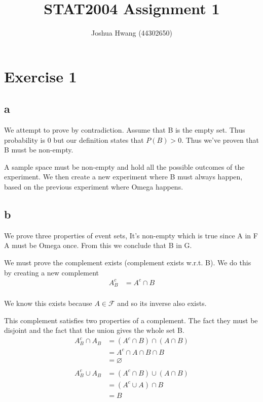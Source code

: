 \documentclass{article}
\title{STAT2004 Assignment 1}
\author{Joshua Hwang (44302650)}
\begin{document}
\maketitle

\section{Exercise 1}
\subsection{a}
We attempt to prove by contradiction. Assume that B is the empty set.
Thus probability is 0 but our definition states that $P(B) > 0$. Thus we've
proven that B must be non-empty.

A sample space must be non-empty and hold all the possible outcomes of the
experiment. We then create a new experiment where B must always happen, based
on the previous experiment where Omega happens.

\subsection{b}
We prove three properties of event sets,
It's non-empty which is true since A in F A must be Omega once. From this
we conclude that B in G.

We must prove the complement exists (complement exists w.r.t. B).
We do this by creating a new complement
\begin{align*}
    A^c_B &= A^c \cap B \\
\end{align*}

We know this exists because $A \in \mathcal{F}$ and so its inverse also exists.

This complement satisfies two properties of
a complement. The fact they must be disjoint and the fact that the
union gives the whole set B.
\begin{align*}
    A^c_B \cap A_B &= (A^c \cap B) \cap (A \cap B) \\
    &= A^c \cap A \cap B \cap B \\
    &= \varnothing \\
\end{align*}
\begin{align*}
    A^c_B \cup A_B &= (A^c \cap B) \cup (A \cap B) \\
    &= (A^c \cup A) \cap B \\
    &= B \\
\end{align*}
\end{document}
